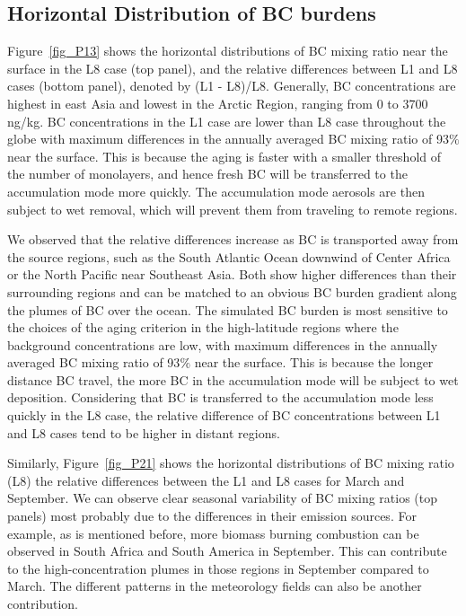 \documentclass[12pt, fullpage]{uiucthesis2009_2}
\begin{document}
	\subsection{Horizontal Distribution of BC burdens}
	Figure~\ref{fig_P13} shows the horizontal distributions of BC mixing ratio near the surface in the L8 case (top panel), and the relative differences between L1 and L8 cases (bottom panel), denoted by (L1 - L8)/L8. Generally, BC concentrations are highest in east Asia and lowest in the Arctic Region, ranging from 0 to 3700 ng/kg. BC concentrations in the L1 case are lower than L8 case throughout the globe with maximum differences in the annually averaged BC mixing ratio of 93$\%$ near the surface. This is because the aging is faster with a smaller threshold of the number of monolayers, and hence fresh BC will be transferred to the accumulation mode more quickly. The accumulation mode aerosols are then subject to wet removal, which will prevent them from traveling to remote regions.     
	
	We observed that the relative differences increase as BC is transported away from the source regions, such as the South Atlantic Ocean downwind of Center Africa or the North Pacific near Southeast Asia. Both show higher differences than their surrounding regions and can be matched to an obvious BC burden gradient along the plumes of BC over the ocean. The simulated BC burden is most sensitive to the choices of the aging criterion in the high-latitude regions where the background concentrations are low, with maximum differences in the annually averaged BC mixing ratio of 93$\%$ near the surface. This is because the longer distance BC travel, the more BC in the accumulation mode will be subject to wet deposition. Considering that BC is transferred to the accumulation mode less quickly in the L8 case, the relative difference of BC concentrations between L1 and L8 cases tend to be higher in distant regions.
	
	Similarly, Figure~\ref{fig_P21} shows the horizontal distributions of BC mixing ratio (L8) the relative differences between the L1 and L8 cases for March and September. We can observe clear seasonal variability of BC mixing ratios (top panels) most probably due to the differences in their emission sources. For example, as is mentioned before, more biomass burning combustion can be observed in South Africa and South America in September. This can contribute to the high-concentration plumes in those regions in September compared to March. The different patterns in the meteorology fields can also be another contribution.
	
\end{document}
